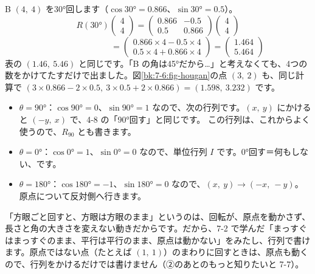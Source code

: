 B $(4,\ 4)$ を30°回します（$\cos30°=0.866$、$\sin30°=0.5$）。
\[R(30°)\begin{pmatrix}4\\4\end{pmatrix}=\begin{pmatrix}0.866&-0.5\\0.5&0.866\end{pmatrix}\begin{pmatrix}4\\4\end{pmatrix}\]
\[\phantom{R(30°)\begin{pmatrix}4\\4\end{pmatrix}}=\begin{pmatrix}0.866\times4-0.5\times4\\0.5\times4+0.866\times4\end{pmatrix}=\begin{pmatrix}1.464\\5.464\end{pmatrix}\]
表の $(1.46,\ 5.46)$ と同じです。「B の角は45°だから…」と考えなくても、4つの数をかけてたすだけで出ました。図\ref{bk:7-6:fig-hougan}の点 $(3,\ 2)$ も、同じ計算で $(3\times0.866-2\times0.5,\ 3\times0.5+2\times0.866)=(1.598,\ 3.232)$ です。

\begin{itemize}[leftmargin=1.2\zw, itemsep=2pt, topsep=2pt, label={\color{\bkTT}●}]
\item $\theta=90°$：$\cos90°=0$、$\sin90°=1$ なので、次の行列です。$(x,\ y)$ にかけると $(-y,\ x)$ で、4-8 の「90°回す」と同じです。
この行列は、これからよく使うので、$R_{90}$ とも書きます。
\item $\theta=0°$：$\cos0°=1$、$\sin0°=0$ なので、単位行列 $I$ です。0°回す＝何もしない、です。
\item $\theta=180°$：$\cos180°=-1$、$\sin180°=0$ なので、$(x,\ y)\to(-x,\ -y)$。原点について反対側へ行きます。
\end{itemize}

\begin{seikaku}
「方眼ごと回すと、方眼は方眼のまま」というのは、回転が、原点を動かさず、長さと角の大きさを変えない動きだからです。だから、7-2 で学んだ「まっすぐはまっすぐのまま、平行は平行のまま、原点は動かない」をみたし、行列で書けます。原点ではない点（たとえば $(1,\ 1)$）のまわりに回すときは、原点も動くので、行列をかけるだけでは書けません（②のあとのもっと知りたいと 7-7）。
\end{seikaku}


